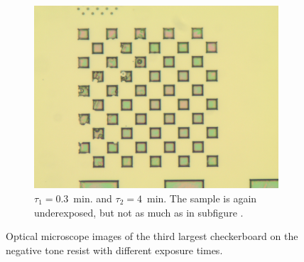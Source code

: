 \begin{figure}[!b]
\begin{subfigure}[t]{0.3\linewidth}
    \end{subfigure}
    \hfill
    \begin{subfigure}[t]{0.3\linewidth}
        \centering
        \includegraphics[width=\textwidth]{data/b2i1.jpg}
	    \caption{$\tau_1 = 0.3$~min. and $\tau_2 = 4$~min. The sample is again underexposed, but not as much as in subfigure .}
	    \label{fig:b2i1}
    \end{subfigure}
    \caption{Optical microscope images of the third largest checkerboard on the negative tone resist with different exposure times.}
    \label{fig:optical-neg}
\end{figure}

